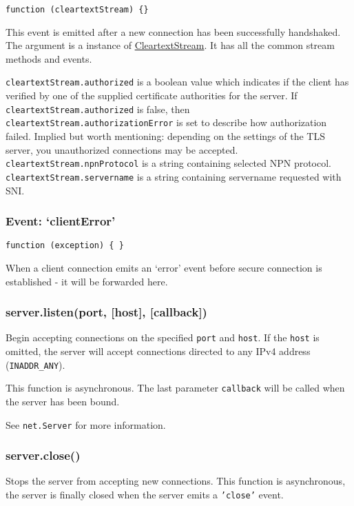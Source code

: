 \texttt{function (cleartextStream) \{\}}

This event is emitted after a new connection has been successfully
handshaked. The argument is a instance of
\hyperref[tls_class_tls_cleartextstream]{CleartextStream}. It has all
the common stream methods and events.

\texttt{cleartextStream.authorized} is a boolean value which indicates
if the client has verified by one of the supplied certificate
authorities for the server. If \texttt{cleartextStream.authorized} is
false, then \texttt{cleartextStream.authorizationError} is set to
describe how authorization failed. Implied but worth mentioning:
depending on the settings of the TLS server, you unauthorized
connections may be accepted. \texttt{cleartextStream.npnProtocol} is a
string containing selected NPN protocol.
\texttt{cleartextStream.servername} is a string containing servername
requested with SNI.

\subsubsection{Event: `clientError'}

\texttt{function (exception) \{ \}}

When a client connection emits an `error' event before secure connection
is established - it will be forwarded here.

\subsubsection{server.listen(port, {[}host{]}, {[}callback{]})}

Begin accepting connections on the specified \texttt{port} and
\texttt{host}. If the \texttt{host} is omitted, the server will accept
connections directed to any IPv4 address (\texttt{INADDR\_ANY}).

This function is asynchronous. The last parameter \texttt{callback} will
be called when the server has been bound.

See \texttt{net.Server} for more information.

\subsubsection{server.close()}

Stops the server from accepting new connections. This function is
asynchronous, the server is finally closed when the server emits a
\texttt{'close'} event.

